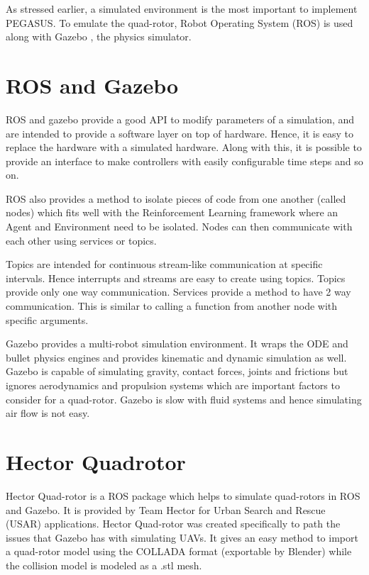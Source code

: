 \documentclass[hidelinks,BTech]{iitmdiss}
\begin{document}
As stressed earlier, a simulated environment is the most important to implement PEGASUS. To emulate the quad-rotor, Robot Operating System (ROS) \cite{ROS} is used along with Gazebo \cite{Gazebo}, the physics simulator.

\section{ROS and Gazebo}

ROS and gazebo provide a good API to modify parameters of a simulation, and are intended to provide a software layer on top of hardware. Hence, it is easy to replace the hardware with a simulated hardware. Along with this, it is possible to provide an interface to make controllers with easily configurable time steps and so on.

ROS also provides a method to isolate pieces of code from one another (called nodes) which fits well with the Reinforcement Learning framework where an Agent and Environment need to be isolated. Nodes can then communicate with each other using services or topics.

Topics are intended for continuous stream-like communication at specific intervals. Hence interrupts and streams are easy to create using topics. Topics provide only one way communication. Services provide a method to have 2 way communication. This is similar to calling a function from another node with specific arguments.

Gazebo provides a multi-robot simulation environment. It wraps the ODE and bullet physics engines and provides kinematic and dynamic simulation as well. Gazebo is capable of simulating gravity, contact forces, joints and frictions but ignores aerodynamics and propulsion systems which are important factors to consider for a quad-rotor. Gazebo is slow with fluid systems and hence simulating air flow is not easy.

\section{Hector Quadrotor}

Hector Quad-rotor \cite{HectorQuadrotor} is a ROS package which helps to simulate quad-rotors in ROS and Gazebo. It is provided by Team Hector for Urban Search and Rescue (USAR) applications. Hector Quad-rotor was created specifically to path the issues that Gazebo has with simulating UAVs. It gives an easy method to import a quad-rotor model using the COLLADA format (exportable by Blender) while the collision model is modeled as a .stl mesh.
\end{document}
